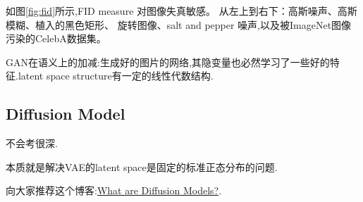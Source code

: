 	如图\ref{fig:fid}所示,FID measure 对图像失真敏感。
	从左上到右下：高斯噪声、高斯模糊、植入的黑色矩形、
	旋转图像、salt and pepper 噪声,以及被ImageNet图像污染的CelebA数据集。
	
	GAN在语义上的加减:生成好的图片的网络,其隐变量也必然学习了一些好的特征.latent
	space structure有一定的线性代数结构.
	
	\subsection{Diffusion Model}

	不会考很深.

	本质就是解决VAE的latent space是固定的标准正态分布的问题.

	向大家推荐这个博客:\href{https://lilianweng.github.io/posts/2021-07-11-diffusion-models/}{What are Diffusion Models?}.
